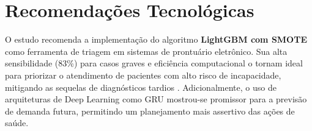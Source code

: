\documentclass[12pt, a4paper]{report}
\begin{document}
\section{Recomendações Tecnológicas}
O estudo recomenda a implementação do algoritmo \textbf{LightGBM com SMOTE} como ferramenta de triagem em sistemas de prontuário eletrônico. Sua alta sensibilidade (83\%) para casos graves e eficiência computacional o tornam ideal para priorizar o atendimento de pacientes com alto risco de incapacidade, mitigando as sequelas de diagnósticos tardios \citep{freitas2025evaluating, barros2024characterization}. Adicionalmente, o uso de arquiteturas de Deep Learning como GRU \citep{wang2024integrating} mostrou-se promissor para a previsão de demanda futura, permitindo um planejamento mais assertivo das ações de saúde.



\end{document}
